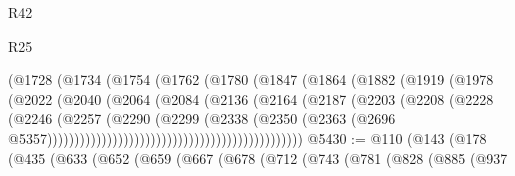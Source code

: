 \begin{lexlean}{R42}
\begin{lexlean}{R25}
\begin{coremodule}
{{{{{{{{{{{{{{{{{{{{{{{{{{{{{{{{{{{{{{{{{{{{{{{{{{{{{{{{{{{{{{{{{{{{{{{{{{{{{{{{{{{{{{{{{{{{{{{{{{{{{{{{{{{{{{{{{{{{{{{{{{{{{{{{{{{{{{{{{{{{{{{{{{{{{{{{{{{{{{{{{{{{{{{{{{{{{{{{{{{{{{{{{{{{{{{{{{{{{{{                                          (@1728
                                            (@1734
                                              (@1754
                                                (@1762
                                                  (@1780
                                                    (@1847
                                                      (@1864
                                                        (@1882
                                                          (@1919
                                                            (@1978
                                                              (@2022
                                                                (@2040
                                                                  (@2064
                                                                    (@2084
                                                                      (@2136
                                                                        (@2164
                                                                          (@2187
                                                                            (@2203
                                                                              (@2208
                                                                                (@2228
                                                                                  (@2246
                                                                                    (@2257
                                                                                      (@2290
                                                                                        (@2299
                                                                                          (@2338
                                                                                            (@2350
                                                                                              (@2363
                                                                                                (@2696
                                                                                                  @5357)))))))))))))))))))))))))))))))))))))))))))))))
@5430 := @110
    (@143
      (@178
        (@435
          (@633
            (@652
              (@659
                (@667
                  (@678
                    (@712
                      (@743
                        (@781
                          (@828
                            (@885
                              (@937
}}}}}}}}}}}}}}}}}}}}}}}}}}}}}}}}}}}}}}}}}}}}}}}}}}}}}}}}}}}}}}}}}}}}}}}}}}}}}}}}}}}}}}}}}}}}}}}}}}}}}}}}}}}}}}}}}}}}}}}}}}}}}}}}}}}}}}}}}}}}}}}}}}}}}}}}}}}}}}}}}}}}}}}}}}}}}}}}}}}}}}}}}}}}}}}}}}}}}}}
\end{coremodule}
\end{lexlean}
\end{lexlean}

